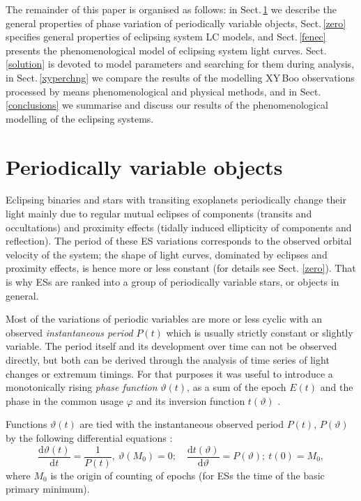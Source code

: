 \documentclass{aa}
\begin{document}
The remainder of this paper is organised as follows: in Sect.\,\ref{gen} we describe the general properties of phase variation of periodically variable objects, Sect.\,\ref{zero} specifies general properties of eclipsing system LC models, and Sect.\,\ref{fenec} presents the phenomenological model of eclipsing system light curves. Sect.\,\ref{solution} is devoted to model parameters and searching for them during analysis, in Sect.\,\ref{xyperchng} we compare the results of the modelling XY\,Boo observations processed by means phenomenological and physical \citep{wilson14} methods, and in Sect.\,\ref{conclusions} we summarise and discuss our results of the phenomenological modelling of the eclipsing systems.


\section{Periodically variable objects}\label{gen}

Eclipsing binaries and stars with transiting exoplanets periodically change their light mainly due to regular mutual eclipses of components (transits and occultations) and proximity effects (tidally induced ellipticity of components and reflection). The period of these ES variations corresponds to the observed orbital velocity of the system; the shape of light curves, dominated by eclipses and proximity effects, is hence more or less constant (for details see Sect. \ref{zero}). That is why ESs are ranked into a group of periodically variable stars, or objects in general.

Most of the variations of periodic variables are more or less cyclic with an observed \textit{instantaneous period} $P(t)$ which is usually strictly constant or slightly variable. The period itself and its development over time can not be observed directly, but both can be derived through the analysis of time series of light changes or extremum timings. For that purposes it was useful to introduce a monotonically rising  \textit{phase function} $\vartheta(t)$, as a sum of the epoch $E(t)$ and the phase in the common usage $\varphi$ and its inversion function $t(\vartheta)$ \citep{mik901}.

Functions $\vartheta(t)$ are tied with the instantaneous observed period $P(t),\,P(\vartheta)$ by the following differential equations \citep[see][]{kalimero,mik901,mikgra}:
\begin{equation}\label{phasefundef}
\frac{\mathrm{d}\vartheta(t)}{\mathrm{d}t}=\frac{1}{P(t)},\ \vartheta(M_0)=0;\quad \frac{\mathrm{d}t(\vartheta)}{\mathrm{d}\vartheta}=P(\vartheta);\ t(0)=M_0,
\end{equation}
where $M_0$ is the origin of counting of epochs (for ESs the time of the basic primary minimum).
\end{document}
